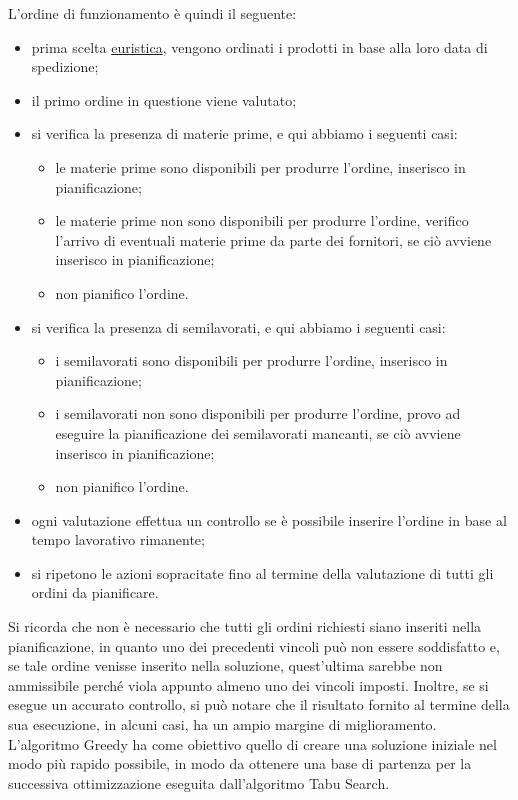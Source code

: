 L'ordine di funzionamento è quindi il seguente:

\begin{itemize}
    \item prima scelta \hyperref[Euristica]{euristica\glo}, vengono ordinati i prodotti in base alla loro data di spedizione;
    \item il primo ordine in questione viene valutato;
    \item si verifica la presenza di materie prime, e qui abbiamo i seguenti casi:
            \begin{itemize}
                \item le materie prime sono disponibili per produrre l'ordine, inserisco in pianificazione;
                \item le materie prime non sono disponibili per produrre l'ordine, verifico l'arrivo di eventuali materie prime da parte dei fornitori,
                 se ciò avviene inserisco in pianificazione;
                \item non pianifico l'ordine.
            \end{itemize}
    \item si verifica la presenza di semilavorati, e qui abbiamo i seguenti casi:
            \begin{itemize}
                \item i semilavorati sono disponibili per produrre l'ordine, inserisco in pianificazione;
                \item i semilavorati non sono disponibili per produrre l'ordine, provo ad eseguire la pianificazione dei semilavorati mancanti, se ciò avviene
                inserisco in pianificazione;
                \item non pianifico l'ordine.
            \end{itemize}
    \item ogni valutazione effettua un controllo se è possibile inserire l'ordine in base al tempo lavorativo rimanente;
    \item si ripetono le azioni sopracitate fino al termine della valutazione di tutti gli ordini da pianificare.
\end{itemize}

Si ricorda che non è necessario che tutti gli ordini richiesti siano inseriti nella pianificazione, in quanto uno dei precedenti vincoli può non essere soddisfatto e, se tale ordine venisse
inserito nella soluzione, quest'ultima sarebbe non ammissibile perché viola appunto almeno uno dei vincoli imposti. Inoltre, se si esegue un accurato controllo, si può notare che 
il risultato fornito al termine della sua esecuzione, in alcuni casi, ha un ampio margine di miglioramento. L'algoritmo Greedy ha come obiettivo quello di creare una
soluzione iniziale nel modo più rapido possibile, in modo da ottenere una base di partenza per la successiva ottimizzazione eseguita dall'algoritmo Tabu Search.\\


